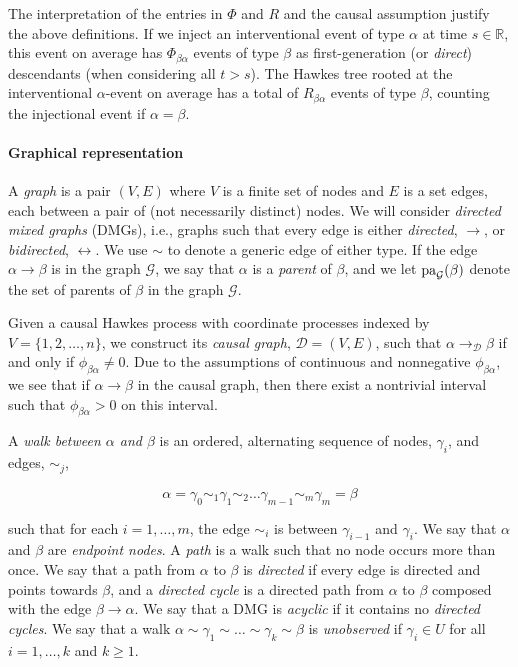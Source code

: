 \documentclass[accepted]{uai2021} %
\newcommand{\pa}{\textnormal{pa}}
\begin{document}
The interpretation of the entries in $\Phi$ and $R$ and the causal assumption 
justify the above definitions. If 
we inject an 
interventional event of type $\alpha$ at time $s \in \mathbb{R}$, this 
event on average has $\Phi_{\beta\alpha}$ events 
of type $\beta$ as first-generation (or \emph{direct}) descendants (when 
considering all $t > s$). The Hawkes tree rooted at the 
interventional $\alpha$-event on average has a total of $R_{\beta\alpha}$ 
events of 
type $\beta$, counting the injectional event if $\alpha=\beta$. 


\paragraph{Graphical representation}

A {\it graph} is a pair $(V,E)$ where $V$ is a finite set of nodes and $E$ is a 
set edges, each between a pair of (not necessarily distinct) nodes. We will  
consider {\it directed mixed graphs} (DMGs), i.e., graphs such that every edge 
is 
either \emph{directed}, $\rightarrow$, or \emph{bidirected}, $\leftrightarrow$. 
We use $\sim$ to denote a generic edge of either type. If the edge 
$\alpha\rightarrow\beta$ is in the graph $\mathcal{G}$, we say that $\alpha$ is 
a \emph{parent} of $\beta$, and we let $\pa_\mathcal{G}(\beta)$ denote the set 
of parents 
of $\beta$ in the graph $\mathcal{G}$.

Given a causal Hawkes process with coordinate processes indexed by $V = 
\{1,2,\ldots,n\}$, we construct its \emph{causal graph}, $\mathcal{D} = (V,E)$, 
such that 
$\alpha \rightarrow_\mathcal{D} \beta$ if and only if $\phi_{\beta\alpha} \neq 
0$. 
Due 
to the assumptions of continuous and nonnegative $\phi_{\beta\alpha}$, we see 
that if $\alpha\rightarrow\beta$ in the causal graph, then there exist a 
nontrivial interval such 
that $\phi_{\beta\alpha} > 0$ on this interval.

A {\it walk between $\alpha$ and $\beta$} is an ordered, alternating sequence 
of nodes, $\gamma_i$, and edges, $\sim_j$,

$$
\alpha = \gamma_0 \sim_1 \gamma_1 \sim_2 \ldots \gamma_{m-1} \sim_m \gamma_{m} 
= \beta
$$

such that for each $i = 1,\ldots,m$, the edge $\sim_i$ is between 
$\gamma_{i-1}$ and $\gamma_i$. We say that $\alpha$ and $\beta$ are 
\emph{endpoint nodes}. A {\it path} is a walk such that no node occurs 
more than once. We say that a path from $\alpha$ to $\beta$ is \emph{directed} 
if every edge is directed and points towards $\beta$, and a \emph{directed 
cycle} is a directed path from $\alpha$ to $\beta$ composed with the edge 
$\beta\rightarrow\alpha$. We say that a DMG is \emph{acyclic} if it contains no 
\emph{directed cycles}. We say that a walk $\alpha \sim \gamma_1 \sim \ldots 
\sim 
\gamma_k \sim \beta$ is \emph{unobserved} if $\gamma_i \in U$ for all $i = 
1,\ldots, k$ and $k \geq 1$. 
\end{document}
